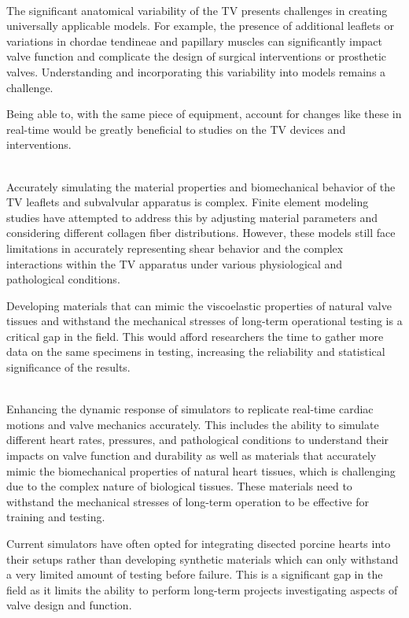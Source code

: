 \\
The significant anatomical variability of the \gls{TV} presents challenges in creating universally applicable models. For example, the presence of additional leaflets or variations in chordae tendineae and papillary muscles can significantly impact valve function and complicate the design of surgical interventions or prosthetic valves. Understanding and incorporating this variability into models remains a challenge.~

Being able to, with the same piece of equipment, account for changes like these in real-time would be greatly beneficial to studies on the \gls{TV} devices and interventions.

\\
Accurately simulating the material properties and biomechanical behavior of the TV leaflets and subvalvular apparatus is complex. Finite element modeling studies have attempted to address this by adjusting material parameters and considering different collagen fiber distributions. However, these models still face limitations in accurately representing shear behavior and the complex interactions within the TV apparatus under various physiological and pathological conditions.~

Developing materials that can mimic the viscoelastic properties of natural valve tissues and withstand the mechanical stresses of long-term operational testing is a critical gap in the field. This would afford researchers the time to gather more data on the same specimens in testing, increasing the reliability and statistical significance of the results.

\\
Enhancing the dynamic response of simulators to replicate real-time cardiac motions and valve mechanics accurately. This includes the ability to simulate different heart rates, pressures, and pathological conditions to understand their impacts on valve function and durability as well as materials that accurately mimic the biomechanical properties of natural heart tissues, which is challenging due to the complex nature of biological tissues. These materials need to withstand the mechanical stresses of long-term operation to be effective for training and testing.

Current simulators have often opted for integrating disected porcine hearts into their setups rather than developing synthetic materials which can only withstand a very limited amount of testing before failure. This is a significant gap in the field as it limits the ability to perform long-term projects investigating aspects of valve design and function.

